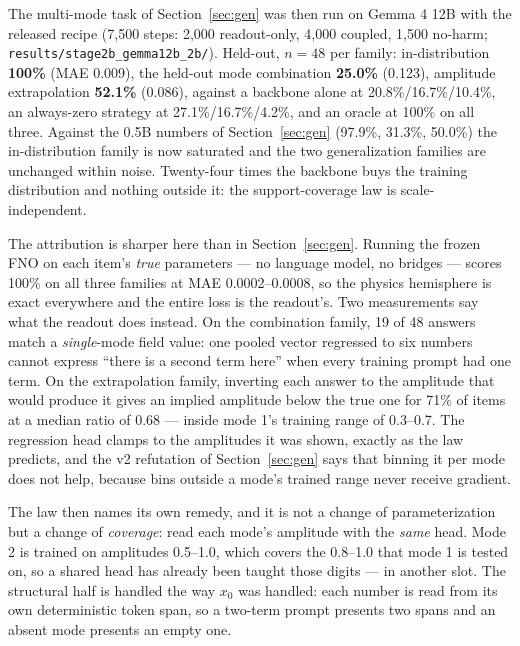 \documentclass[11pt]{article}
\newcommand{\code}[1]{\texttt{#1}}
\begin{document}
The multi-mode task of Section~\ref{sec:gen} was then run on Gemma 4 12B with the released recipe (7,500 steps: 2,000 readout-only, 4,000 coupled, 1,500 no-harm; \code{results/stage2b\_gemma12b\_2b/}). Held-out, $n{=}48$ per family: in-distribution \textbf{100\%} (MAE 0.009), the held-out mode combination \textbf{25.0\%} (0.123), amplitude extrapolation \textbf{52.1\%} (0.086), against a backbone alone at 20.8\%/16.7\%/10.4\%, an always-zero strategy at 27.1\%/16.7\%/4.2\%, and an oracle at 100\% on all three. Against the 0.5B numbers of Section~\ref{sec:gen} (97.9\%, 31.3\%, 50.0\%) the in-distribution family is now saturated and the two generalization families are unchanged within noise. Twenty-four times the backbone buys the training distribution and nothing outside it: the support-coverage law is scale-independent.

The attribution is sharper here than in Section~\ref{sec:gen}. Running the frozen FNO on each item's \emph{true} parameters --- no language model, no bridges --- scores 100\% on all three families at MAE 0.0002--0.0008, so the physics hemisphere is exact everywhere and the entire loss is the readout's. Two measurements say what the readout does instead. On the combination family, 19 of 48 answers match a \emph{single}-mode field value: one pooled vector regressed to six numbers cannot express ``there is a second term here'' when every training prompt had one term. On the extrapolation family, inverting each answer to the amplitude that would produce it gives an implied amplitude below the true one for 71\% of items at a median ratio of 0.68 --- inside mode 1's training range of 0.3--0.7. The regression head clamps to the amplitudes it was shown, exactly as the law predicts, and the v2 refutation of Section~\ref{sec:gen} says that binning it per mode does not help, because bins outside a mode's trained range never receive gradient.

The law then names its own remedy, and it is not a change of parameterization but a change of \emph{coverage}: read each mode's amplitude with the \emph{same} head. Mode 2 is trained on amplitudes 0.5--1.0, which covers the 0.8--1.0 that mode 1 is tested on, so a shared head has already been taught those digits --- in another slot. The structural half is handled the way $x_0$ was handled: each number is read from its own deterministic token span, so a two-term prompt presents two spans and an absent mode presents an empty one.
\end{document}
